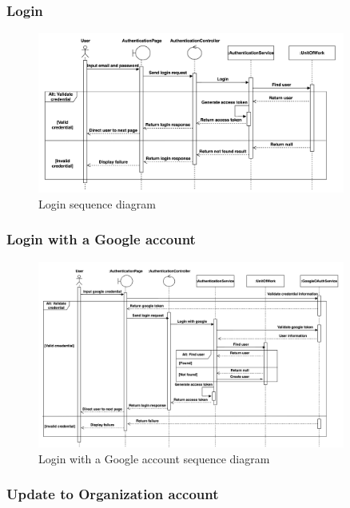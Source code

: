 \subsubsection{Login}

\begin{figure}[H]
  \centering
  \includegraphics[width=0.9\textwidth]{Figures/login_seq.png}
  \caption{Login sequence diagram}
  \label{fig:login-seq}
\end{figure}
\clearpage
\subsubsection{Login with a Google account}

\begin{figure}[H]
  \centering
  \includegraphics[width=0.9\textwidth]{Figures/login_gg_seq.png}
  \caption{Login with a Google account sequence diagram}
  \label{fig:login-google-seq}
\end{figure}

\subsubsection{Update to Organization account}

